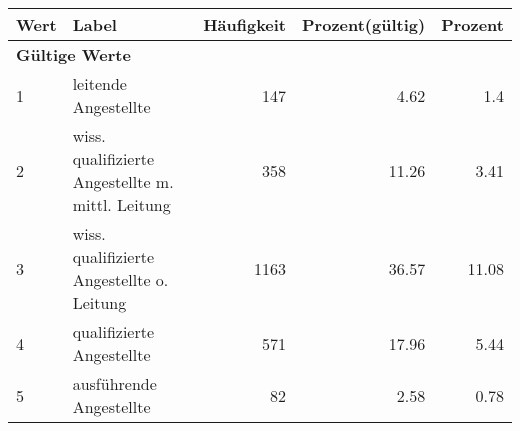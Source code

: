      \begin{longtable}{lXrrr}
     \toprule
     \textbf{Wert} & \textbf{Label} & \textbf{Häufigkeit} & \textbf{Prozent(gültig)} & \textbf{Prozent} \\
     \endhead
     \midrule
     \multicolumn{5}{l}{\textbf{Gültige Werte}}\\

     1 &
     \multicolumn{1}{X}{ leitende Angestellte   } &


       \num{147} &
       \num[round-mode=places,round-precision=2]{4,62} &
         \num[round-mode=places,round-precision=2]{1,4} \\

     2 &
     \multicolumn{1}{X}{ wiss. qualifizierte Angestellte m. mittl. Leitung   } &


       \num{358} &
       \num[round-mode=places,round-precision=2]{11,26} &
         \num[round-mode=places,round-precision=2]{3,41} \\

     3 &
     \multicolumn{1}{X}{ wiss. qualifizierte Angestellte o. Leitung   } &


       \num{1163} &
       \num[round-mode=places,round-precision=2]{36,57} &
         \num[round-mode=places,round-precision=2]{11,08} \\

     4 &
     \multicolumn{1}{X}{ qualifizierte Angestellte   } &


       \num{571} &
       \num[round-mode=places,round-precision=2]{17,96} &
         \num[round-mode=places,round-precision=2]{5,44} \\

     5 &
     \multicolumn{1}{X}{ ausführende Angestellte   } &


       \num{82} &
       \num[round-mode=places,round-precision=2]{2,58} &
         \num[round-mode=places,round-precision=2]{0,78} \\


\end{longtable}
